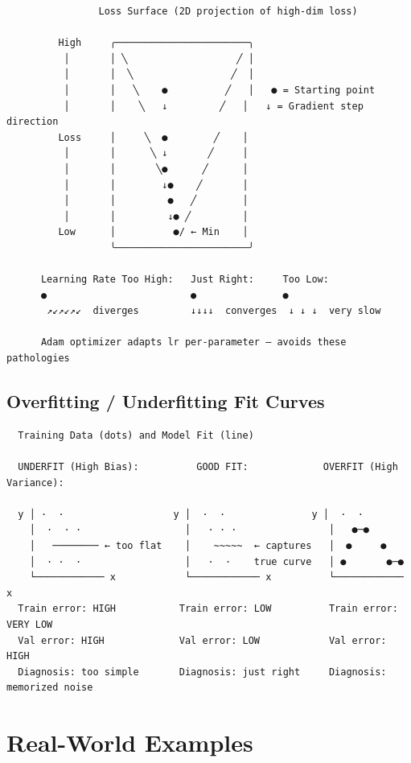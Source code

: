 \documentclass[11pt]{article}
\begin{document}
\setcodelang{}

\begin{verbatim}
                Loss Surface (2D projection of high-dim loss)
                
         High     ╭───────────────────────╮
          │       │ ╲                   ╱ │
          │       │  ╲                 ╱  │
          │       │   ╲    ●          ╱   │   ● = Starting point
          │       │    ╲   ↓         ╱   │   ↓ = Gradient step direction
         Loss     │     ╲  ●        ╱    │
          │       │      ╲ ↓       ╱     │
          │       │       ╲●      ╱      │
          │       │        ↓●    ╱       │
          │       │         ●   ╱        │
          │       │         ↓● ╱         │
         Low      │          ●/ ← Min    │
                  ╰───────────────────────╯
                  
      Learning Rate Too High:   Just Right:     Too Low:
      ●                         ●               ●
       ↗↙↗↙↗↙  diverges         ↓↓↓↓  converges  ↓ ↓ ↓  very slow
       
      Adam optimizer adapts lr per-parameter — avoids these pathologies
\end{verbatim}

\subsection{Overfitting / Underfitting Fit Curves}\label{overfitting--underfitting-fit-curves}

\setcodelang{}

\begin{verbatim}
  Training Data (dots) and Model Fit (line)

  UNDERFIT (High Bias):          GOOD FIT:             OVERFIT (High Variance):
  
  y │ ·  ·                   y │  ·  ·               y │  ·  ·
    │  ·  · ·                  │   · · ·                │   ●─●
    │   ──────── ← too flat    │    ~~~~~  ← captures   │  ●     ●
    │  · ·  ·                  │   ·  ·    true curve   │ ●       ●─●
    └──────────── x            └──────────── x          └──────────── x
  Train error: HIGH           Train error: LOW          Train error: VERY LOW
  Val error: HIGH             Val error: LOW            Val error: HIGH
  Diagnosis: too simple       Diagnosis: just right     Diagnosis: memorized noise
\end{verbatim}

\section{Real-World Examples}\label{real-world-examples}
\end{document}
